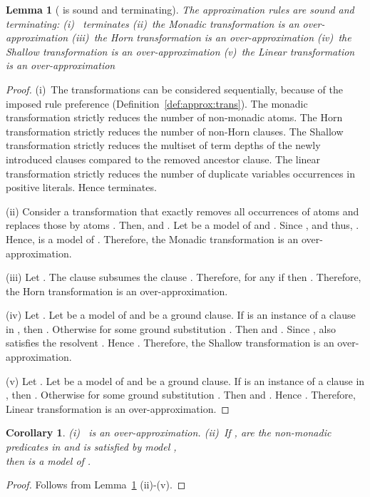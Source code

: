 \documentclass{llncs}
\newtheorem{lem}[theorem]{Lemma}
\newtheorem{cor}[theorem]{Corollary}
\begin{document}
\begin{lem}[ is sound and terminating]\label{Apr_sound}
The approximation rules are sound and terminating:
(i)~  terminates
(ii)~the Monadic transformation is an over-approximation
(iii)~the Horn transformation is an over-approximation
(iv)~the Shallow transformation is an over-approximation
(v)~the Linear transformation is an over-approximation
\end{lem}
\begin{proof}
(i)~The transformations can be considered sequentially, because of the imposed rule preference (Definition~\ref{def:approx:trans}). 
The monadic transformation strictly reduces the number of non-monadic atoms.
The Horn transformation strictly reduces the number of non-Horn clauses.
The Shallow transformation strictly reduces the multiset of term depths of the newly introduced clauses compared
to the removed ancestor clause.
The linear transformation strictly reduces the number of duplicate variables occurrences in positive literals. 
Hence   terminates.

(ii) Consider a transformation  that exactly removes all occurrences of atoms  and
replaces those by atoms .
Then,  and .
Let  be a model of  and .  
Since  ,  and thus, .
Hence,  is a  model of .
Therefore, the Monadic transformation is an over-approximation.

(iii) Let .
The clause  subsumes the clause . Therefore, for any 
if   then .
Therefore, the Horn transformation is an over-approximation.

(iv) Let .
Let  be a model of  and  be a ground clause. 
If  is an instance of a clause in , then .
Otherwise  for some ground substitution .
Then  
and .
Since ,  also satisfies the resolvent . 
Hence .
Therefore, the Shallow transformation is an over-approximation.

(v)  Let .
Let  be a model of  and  be a ground clause. 
If  is an instance of a clause in , then .
Otherwise  for some ground substitution .
Then  and
.
Hence .
Therefore, Linear transformation is an over-approximation.
\end{proof}


\begin{cor}
(i)~ is an over-approximation.
(ii)~If ,  are the non-monadic predicates in  and  is satisfied by model , \\
then    is a model of .
\end{cor}
\begin{proof}
Follows from Lemma~\ref{Apr_sound} (ii)-(v).
\end{proof}
\end{document}
